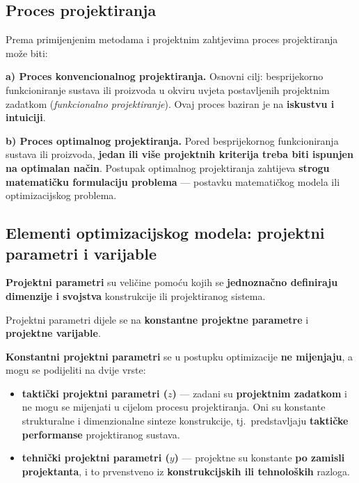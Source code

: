 \subsection{Proces projektiranja}

Prema primijenjenim metodama i projektnim zahtjevima proces projektiranja može
biti:

\textbf{a) Proces konvencionalnog projektiranja.} Osnovni cilj: besprijekorno
funkcioniranje sustava ili proizvoda u okviru uvjeta postavljenih projektnim
zadatkom (\emph{funkcionalno projektiranje}). Ovaj proces baziran je na
\textbf{iskustvu i intuiciji}.

\textbf{b) Proces optimalnog projektiranja.} Pored besprijekornog
funkcioniranja sustava ili proizvoda, \textbf{jedan ili više projektnih
kriterija treba biti ispunjen na optimalan način}. Postupak optimalnog
projektiranja zahtijeva \textbf{strogu matematičku formulaciju problema} ---
postavku matematičkog modela ili optimizacijskog problema.

\subsection{Elementi optimizacijskog modela: projektni parametri i varijable}

\begin{definicija}
\textbf{Projektni parametri} su veličine pomoću kojih se \textbf{jednoznačno
definiraju dimenzije i svojstva} konstrukcije ili projektiranog sistema.
\end{definicija}

Projektni parametri dijele se na \textbf{konstantne projektne parametre} i
\textbf{projektne varijable}.

\textbf{Konstantni projektni parametri} se u postupku optimizacije \textbf{ne
mijenjaju}, a mogu se podijeliti na dvije vrste:

\begin{itemize}
  \item \textbf{taktički projektni parametri ($z$)} --- zadani su
        \textbf{projektnim zadatkom} i ne mogu se mijenjati u cijelom procesu
        projektiranja. Oni su konstante strukturalne i dimenzionalne sinteze
        konstrukcije, tj.\ predstavljaju \textbf{taktičke performanse}
        projektiranog sustava.
  \item \textbf{tehnički projektni parametri ($y$)} --- projektne su konstante
        \textbf{po zamisli projektanta}, i to prvenstveno iz
        \textbf{konstrukcijskih ili tehnoloških} razloga.
\end{itemize}

